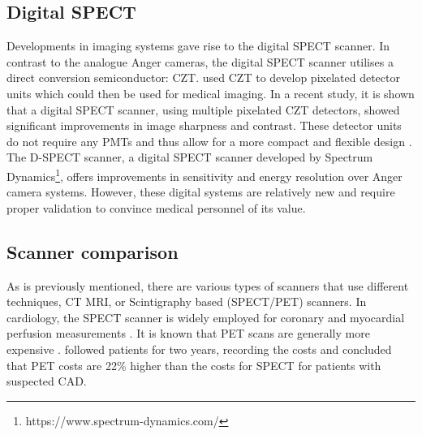 \subsection{Digital SPECT}
Developments in imaging systems gave rise to the digital \ac{SPECT} scanner. In contrast to the analogue Anger cameras, the digital \ac{SPECT} scanner utilises a direct conversion semiconductor: \ac{CZT}. \cite{wagenaar2004cdte} used \ac{CZT} to develop pixelated detector units which could then be used for medical imaging. In a recent study, it is shown that a digital \ac{SPECT} scanner, using multiple pixelated \ac{CZT} detectors, showed significant improvements in image sharpness and contrast\citep{goshen2018feasibility}. These detector units do not require any \acp{PMT} and thus allow for a more compact and flexible design \citep{erlandsson2009performance}. The D-SPECT scanner, a digital \ac{SPECT} scanner developed by Spectrum Dynamics\footnote{https://www.spectrum-dynamics.com/}, offers improvements in sensitivity and energy resolution \citep{SpectDynam2018} over Anger camera systems. However, these digital systems are relatively new and require proper validation to convince medical personnel of its value.

\subsection{Scanner comparison}
As is previously mentioned, there are various types of scanners that use different techniques, \ac{CT} \ac{MRI}, or Scintigraphy based (\ac{SPECT}/\ac{PET}) scanners. In cardiology, the \ac{SPECT} scanner is widely employed for coronary and myocardial perfusion measurements \citep{rahmim2008pet}. It is known that \ac{PET} scans are generally more expensive \citep{hlatky2014economic, RadioPead2018}. \cite{hlatky2014economic} followed patients for two years, recording the costs and concluded that \ac{PET} costs are 22\% higher than the costs for \ac{SPECT} for patients with suspected \ac{CAD}.